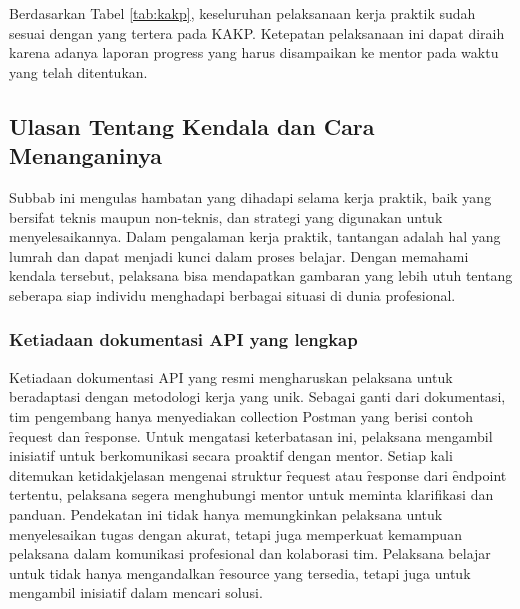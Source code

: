 Berdasarkan Tabel \ref{tab:kakp}, keseluruhan pelaksanaan kerja praktik sudah
sesuai dengan yang tertera pada KAKP. Ketepatan pelaksanaan ini dapat diraih
karena adanya laporan progress yang harus disampaikan ke mentor pada waktu yang
telah ditentukan.

\subsection{Ulasan Tentang Kendala dan Cara Menanganinya}
\label{sec:kendala}
Subbab ini mengulas hambatan yang dihadapi selama kerja praktik, baik yang
bersifat teknis maupun non-teknis, dan strategi yang digunakan untuk
menyelesaikannya. Dalam pengalaman kerja praktik, tantangan adalah hal yang
lumrah dan dapat menjadi kunci dalam proses belajar. Dengan memahami kendala
tersebut, pelaksana bisa mendapatkan gambaran yang lebih utuh tentang seberapa
siap individu menghadapi berbagai situasi di dunia profesional.

\subsubsection{Ketiadaan dokumentasi API yang lengkap}
\label{sec:kendalaAPI}
Ketiadaan dokumentasi API yang resmi mengharuskan pelaksana untuk beradaptasi
dengan metodologi kerja yang unik. Sebagai ganti dari dokumentasi, tim pengembang
hanya menyediakan collection Postman yang berisi contoh \f{request} dan
\f{response}. Untuk mengatasi keterbatasan ini, pelaksana mengambil inisiatif
untuk berkomunikasi secara proaktif dengan mentor. Setiap kali ditemukan
ketidakjelasan mengenai struktur \f{request} atau \f{response} dari \f{endpoint}
tertentu, pelaksana segera menghubungi mentor untuk meminta klarifikasi dan
panduan. Pendekatan ini tidak hanya memungkinkan pelaksana untuk menyelesaikan
tugas dengan akurat, tetapi juga memperkuat kemampuan pelaksana dalam komunikasi
profesional dan kolaborasi tim. Pelaksana belajar untuk tidak hanya mengandalkan
\f{resource} yang tersedia, tetapi juga untuk mengambil inisiatif dalam mencari
solusi.

